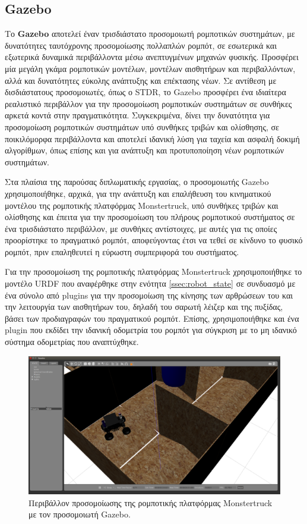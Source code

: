 \subsection{Gazebo} \label{ssec:gazebo}
Το \textbf{Gazebo} αποτελεί έναν τρισδιάστατο προσομοιωτή ρομποτικών συστημάτων, με δυνατότητες ταυτόχρονης προσομοίωσης πολλαπλών ρομπότ, σε εσωτερικά και εξωτερικά δυναμικά περιβάλλοντα μέσω ανεπτυγμένων μηχανών φυσικής. Προσφέρει μία μεγάλη γκάμα ρομποτικών μοντέλων, μοντέλων αισθητήρων και περιβαλλόντων, αλλά και δυνατότητες εύκολης ανάπτυξης και επέκτασης νέων. Σε αντίθεση με δισδιάστατους προσομοιωτές, όπως ο STDR, το Gazebo προσφέρει ένα ιδιαίτερα ρεαλιστικό περιβάλλον για την προσομοίωση ρομποτικών συστημάτων σε συνθήκες αρκετά κοντά στην πραγματικότητα. Συγκεκριμένα, δίνει την δυνατότητα για προσομοίωση ρομποτικών συστημάτων υπό συνθήκες τριβών και ολίσθησης, σε ποικιλόμορφα περιβάλλοντα και αποτελεί ιδανική λύση για ταχεία και ασφαλή δοκιμή αλγορίθμων, όπως επίσης και για ανάπτυξη και προτυποποίηση νέων ρομποτικών συστημάτων.

\bigskip
Στα πλαίσια της παρούσας διπλωματικής εργασίας, ο προσομοιωτής Gazebo χρησιμοποιήθηκε, αρχικά, για την ανάπτυξη και επαλήθευση του κινηματικού μοντέλου της ρομποτικής πλατφόρμας Monstertruck, υπό συνθήκες τριβών και ολίσθησης και έπειτα για την προσομοίωση του πλήρους ρομποτικού συστήματος σε ένα τρισδιάστατο περιβάλλον, με συνθήκες αντίστοιχες, με αυτές για τις οποίες προορίστηκε το πραγματικό ρομπότ, αποφεύγοντας έτσι να τεθεί σε κίνδυνο το φυσικό ρομπότ, πριν επαληθευτεί η εύρωστη συμπεριφορά του συστήματος.

\bigskip
Για την προσομοίωση της ρομποτικής πλατφόρμας Monstertruck χρησιμοποιήθηκε το μοντέλο URDF που αναφέρθηκε στην ενότητα \ref{ssec:robot_state} σε συνδυασμό με ένα σύνολο από plugins για την προσομοίωση της κίνησης των αρθρώσεων του και την λειτουργία των αισθητήρων του, δηλαδή του σαρωτή λέιζερ και της πυξίδας, βάσει των προδιαγραφών του πραγματικού ρομπότ. Επίσης, χρησιμοποιήθηκε και ένα plugin που εκδίδει την ιδανική οδομετρία του ρομπότ για σύγκριση με το μη ιδανικό σύστημα οδομετρίας που αναπτύχθηκε.

\begin{figure}[!ht]
	\centering
	\includegraphics[width=\linewidth]{Chapters/Chapter4/Figures/gazebo_simulator.png}
	\caption{Περιβάλλον προσομοίωσης της ρομποτικής πλατφόρμας Monstertruck με τον προσομοιωτή Gazebo.}
	\label{fig:gazebo_simulator}
\end{figure}


